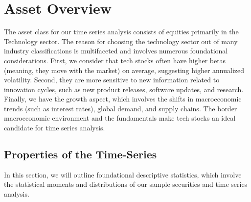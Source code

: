 %
\chapter{Asset Overview}

The asset class for our time series analysis consists of equities primarily in the Technology sector. The reason for choosing the technology sector out of many industry classifications is multifaceted and involves numerous foundational considerations. First, we consider that tech stocks often have higher betas (meaning, they move with the market) on average, suggesting higher annualized volatility. Second, they are more sensitive to new information related to innovation cycles, such as new product releases, software updates, and research. Finally, we have the growth aspect, which involves the shifts in macroeconomic trends (such as interest rates), global demand, and supply chains. The border macroeconomic environment and the fundamentals make tech stocks an ideal candidate for time series analysis.

\section{Properties of the Time-Series}

In this section, we will outline foundational descriptive statistics, which involve the statistical moments and distributions of our sample securities and time series analysis.

